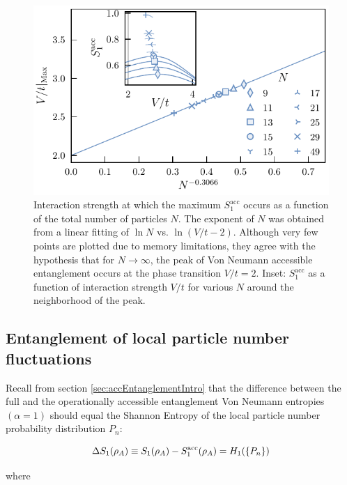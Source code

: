 \begin{figure}[htp]
\begin{center}
\includegraphics[width=1.0\columnwidth]{peakScalingOddN.pdf}
\end{center}
\caption{Interaction strength at which the maximum $S_{1}^{\mathrm{acc}}$ occurs as a function of the total number of particles $N$. The exponent of $N$ was obtained from a linear fitting of $\ln N$ vs. $\ln{(V/t - 2)}$.  Although very few points are plotted due to memory limitations, they agree with the hypothesis that for $N \to \infty$, the peak of Von Neumann accessible entanglement occurs at the phase transition $V/t = 2$. Inset: $S_{1}^{\mathrm{acc}}$ as a function of interaction strength $V/t$ for various $N$ around the neighborhood of the peak.}
\label{fig:peakScalingOddN}
\end{figure}

\subsection{Entanglement of local particle number fluctuations}

Recall from section \ref{sec:accEntanglementIntro} that the difference between the full and the operationally accessible entanglement Von Neumann entropies $\left( \alpha = 1 \right)$ should equal the Shannon Entropy of the local particle number probability distribution $P_n$:

%
\begin{equation}
    \Delta S_1 (\rho_A) \equiv S_1(\rho_A) - S_1^{\rm acc}(\rho_A) = H_1(\{P_n\})
    \label{eq:DeltaS1}
\end{equation}
%

where

